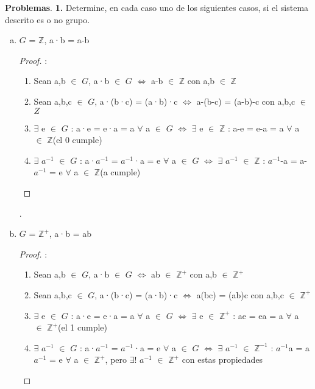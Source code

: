 \documentclass[10pt,a4paper,oneside]{article}
\begin{document}
			\newline
			\textbf{Problemas}.
			\newline
			\newline
			\textbf{1.} Determine, en cada caso uno de los siguientes casos, si el sistema descrito es o no grupo.
			\newline
			\begin{enumerate}[a)]
				\item $G$ = $\mathbb{Z}$, a·b = a-b
					\newline
					\begin{proof}:
						\newline
						\begin{enumerate}[1.]
							\item Sean a,b $\in$ $G$, a·b $\in$ $G$ $\iff$ a-b $\in$ $\mathbb{Z}$ con a,b $\in$ $\mathbb{Z}$
							\item Sean a,b,c $\in$ $G$, a·(b·c) = (a·b)·c $\iff$ a-(b-c) = (a-b)-c con a,b,c $\in$ $Z$
							\item $\exists$ e $\in$ $G$ : a·e = e·a = a $\forall$ a $\in$ $G$ $\iff$ $\exists$ e $\in$ $\mathbb{Z}$ : a-e = e-a = a $\forall$ a $\in$ $\mathbb{Z}$(el 0 cumple)
							\item $\exists$ $a^{-1}$ $\in$ $G$ : a·$a^{-1}$ = $a^{-1}$·a = e $\forall$ a $\in$ $G$ $\iff$ $\exists$ $a^{-1}$ $\in$ $\mathbb{Z}$ : $a^{-1}$-a = a-$a^{-1}$ = e $\forall$ a $\in$ $\mathbb{Z}$(a cumple)
						\end{enumerate}
					\end{proof}.
				\newline
				\item $G$ = $\mathbb{Z}^{+}$, a·b = ab
					\newline
					\begin{proof}:
						\newline
						\begin{enumerate}[1.]
							\item Sean a,b $\in$ $G$, a·b $\in$ $G$ $\iff$ ab $\in$ $\mathbb{Z}^{+}$ con a,b $\in$ $\mathbb{Z}^{+}$
							\item Sean a,b,c $\in$ $G$, a·(b·c) = (a·b)·c $\iff$ a(bc) = (ab)c con a,b,c $\in$ $\mathbb{Z}^{+}$
							\item $\exists$ e $\in$ $G$ : a·e = e·a = a $\forall$ a $\in$ $G$ $\iff$ $\exists$ e $\in$ $\mathbb{Z}^{+}$ : ae = ea = a $\forall$ a $\in$ $\mathbb{Z}^{+}$(el 1 cumple)
							\item $\exists$ $a^{-1}$ $\in$ $G$ : a·$a^{-1}$ = $a^{-1}$·a = e $\forall$ a $\in$ $G$ $\iff$ $\exists$ $a^{-1}$ $\in$ $\mathbb{Z}^{-1}$ : $a^{-1}$a = a$a^{-1}$ = e $\forall$ a $\in$ $\mathbb{Z}^{+}$, pero $\exists!$ $a^{-1}$ $\in$ $\mathbb{Z}^{+}$ con estas propiedades

\end{enumerate}
\end{proof}
\end{enumerate}
\end{document}
